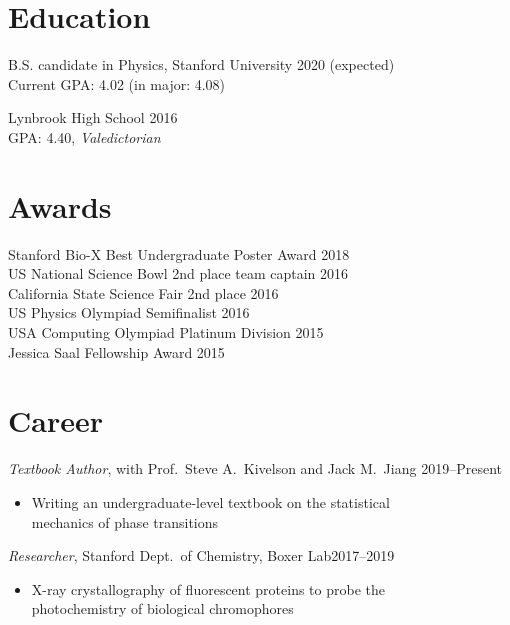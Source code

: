 \documentclass[margin, 10pt]{res}
\newenvironment{myitemize}
{ \vspace{-1.5\topsep} \begin{itemize} }
{ \end{itemize} \vspace{-1.0\topsep}}
\begin{document}
\address{jeffjar@stanford.edu --- \url{https://stanford.edu/~jeffjar}}

\begin{resume}

\section{Education}

B.S. candidate in Physics, Stanford University \hfill 2020 (expected) \\
Current GPA: 4.02 (in major: 4.08)
 
Lynbrook High School \hfill 2016 \\
GPA: 4.40, \textit{Valedictorian}

\section{Awards}
 
Stanford Bio-X Best Undergraduate Poster Award \hfill 2018 \\
US National Science Bowl 2nd place team captain \hfill 2016 \\
California State Science Fair 2nd place \hfill 2016 \\
US Physics Olympiad Semifinalist \hfill 2016 \\
USA Computing Olympiad Platinum Division \hfill 2015 \\
Jessica Saal Fellowship Award \hfill 2015

\section{Career}

\textit{Textbook Author}, with Prof.\ Steve A.\ Kivelson and Jack M.\ Jiang  \hfill 2019--Present \\
\begin{myitemize}
    \item Writing an undergraduate-level textbook on the statistical\\
        mechanics of phase transitions
\end{myitemize}

\textit{Researcher}, Stanford Dept.\ of Chemistry, Boxer Lab\hfill 2017--2019 \\
\begin{myitemize}
    \item X-ray crystallography of fluorescent proteins to probe the\\ photochemistry of biological chromophores
\end{myitemize}


\end{resume}
\end{document}
